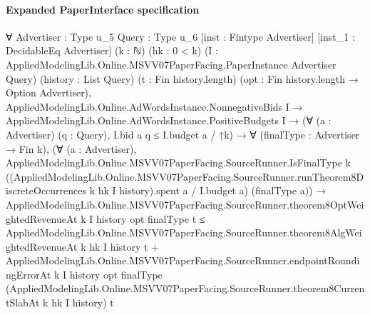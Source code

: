\documentclass[10pt]{article}
\begin{document}
\paragraph{Expanded PaperInterface specification}
\begin{ReviewVerbatim}
∀ {Advertiser : Type u_5} {Query : Type u_6} [inst : Fintype Advertiser] [inst_1 : DecidableEq Advertiser] (k : ℕ)
  (hk : 0 < k) (I : AppliedModelingLib.Online.MSVV07PaperFacing.PaperInstance Advertiser Query) (history : List Query)
  (t : Fin history.length) (opt : Fin history.length → Option Advertiser),
  AppliedModelingLib.Online.AdWordsInstance.NonnegativeBids I →
    AppliedModelingLib.Online.AdWordsInstance.PositiveBudgets I →
      (∀ (a : Advertiser) (q : Query), I.bid a q ≤ I.budget a / ↑k) →
        ∀ (finalType : Advertiser → Fin k),
          (∀ (a : Advertiser),
              AppliedModelingLib.Online.MSVV07PaperFacing.SourceRunner.IsFinalType k
                ((AppliedModelingLib.Online.MSVV07PaperFacing.SourceRunner.runTheorem8DiscreteOccurrences k hk I
                        history).spent
                    a /
                  I.budget a)
                (finalType a)) →
            AppliedModelingLib.Online.MSVV07PaperFacing.SourceRunner.theorem8OptWeightedRevenueAt k I history opt
                finalType t ≤
              AppliedModelingLib.Online.MSVV07PaperFacing.SourceRunner.theorem8AlgWeightedRevenueAt k hk I history t +
                AppliedModelingLib.Online.MSVV07PaperFacing.SourceRunner.endpointRoundingErrorAt k I history opt
                  finalType
                  (AppliedModelingLib.Online.MSVV07PaperFacing.SourceRunner.theorem8CurrentSlabAt k hk I history) t
\end{ReviewVerbatim}
\end{document}
